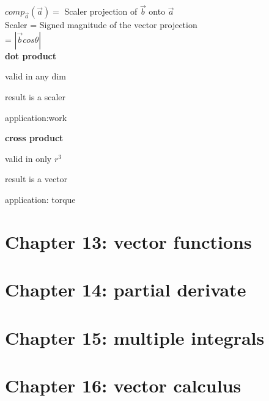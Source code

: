 \documentclass{article}
\begin{document}
$comp_{\vec{a}}(\vec{a}) =$ Scaler projection of $\vec{b}$ onto $\vec{a}$ \\
Scaler           =  Signed magnitude of the vector projection \\
                 = $|\vec{b} cos\theta|$\\


\textbf{dot product}

\begin{list}{-}{}
\item valid in any dim
\item result is a scaler
\item application:work
\end{list}

\textbf{cross product}
\begin{list}{-}{}
\item valid in only $r^3$
\item result is a vector 
\item application: torque
\end{list}

\section{Chapter 13: vector functions}

\section{Chapter 14: partial derivate}

\section{Chapter 15: multiple integrals}

\section{Chapter 16: vector calculus}
\end{document}
